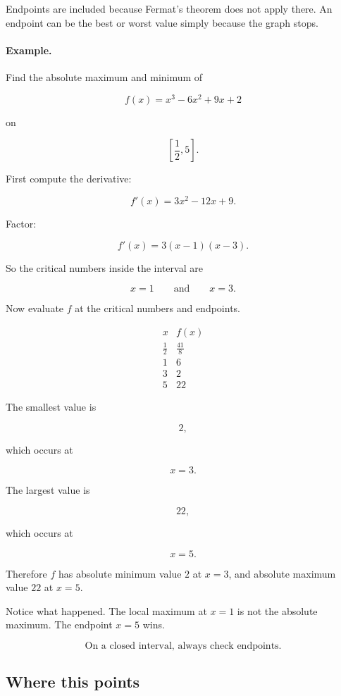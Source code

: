Endpoints are included because Fermat's theorem does not apply there.  An endpoint
can be the best or worst value simply because the graph stops.

\paragraph{Example.}
Find the absolute maximum and minimum of

\[
f(x)=x^3-6x^2+9x+2
\]

on

\[
\left[\frac12,5\right].
\]

First compute the derivative:

\[
f'(x)=3x^2-12x+9.
\]

Factor:

\[
f'(x)=3(x-1)(x-3).
\]

So the critical numbers inside the interval are

\[
x=1
\qquad\text{and}\qquad
x=3.
\]

Now evaluate \(f\) at the critical numbers and endpoints.

\[
\begin{array}{c|c}
x & f(x) \\ \hline
\frac12 & \frac{41}{8} \\[3pt]
1 & 6 \\[3pt]
3 & 2 \\[3pt]
5 & 22
\end{array}
\]

The smallest value is

\[
2,
\]

which occurs at

\[
x=3.
\]

The largest value is

\[
22,
\]

which occurs at

\[
x=5.
\]

Therefore \(f\) has absolute minimum value \(2\) at \(x=3\), and absolute maximum
value \(22\) at \(x=5\).

Notice what happened.  The local maximum at \(x=1\) is not the absolute maximum.
The endpoint \(x=5\) wins.

\[
\boxed{
\text{On a closed interval, always check endpoints.}
}
\]

\subsection{Where this points}
\label{subsec:extrema-hook-mvt}

